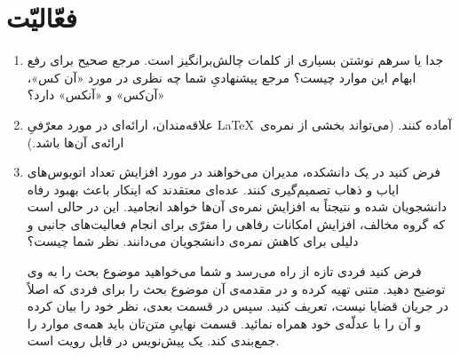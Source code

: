 \documentclass{article}
\begin{document}
\section{فعّالیّت}
\begin{enumerate}
\item جدا یا سرهم نوشتن بسیاری از کلمات چالش‌برانگیز است. مرجع صحیح برای رفع ابهام این موارد چیست؟ مرجع پیشنهادیِ شما چه نظری در مورد «آن کس»، «آن‌کس» و «آنکس» دارد؟
\item علاقه‌مندان، ارائه‌ای در مورد معرّفیِ \LaTeX~آماده کنند. (می‌تواند بخشی از نمره‌ی ارائه‌ی آن‌ها باشد.)
\item فرض کنید در یک دانشکده، مدیران می‌خواهند در مورد افزایش تعداد اتوبوس‌های ایاب و ذهاب تصمیم‌گیری کنند. عده‌ای معتقدند که اینکار باعث بهبود رفاه دانشجویان شده و نتیجتاً به افزایش نمره‌ی آن‌ها خواهد انجامید. این در حالی است که گروه مخالف، افزایش امکانات رفاهی را مفرّی برای انجام فعالیت‌های جانبی و دلیلی برای کاهش نمره‌ی دانشجویان می‌دانند. نظر شما چیست؟

	فرض کنید فردی تازه از راه می‌رسد و شما می‌خواهید موضوع بحث را به وی توضیح دهید. متنی تهیه کرده و در مقدمه‌ی آن  موضوع بحث را برای فردی که اصلاً در جریان قضایا نیست، تعریف کنید. سپس در قسمت بعدی، نظر خود را بیان کرده و آن را با عدلّه‌ی خود همراه نمائید. قسمت نهاییِ متن‌تان باید همه‌ی موارد را جمع‌بندی کند. یک پیش‌نویس در  قابل رویت است.
\end{enumerate}
\end{document}
